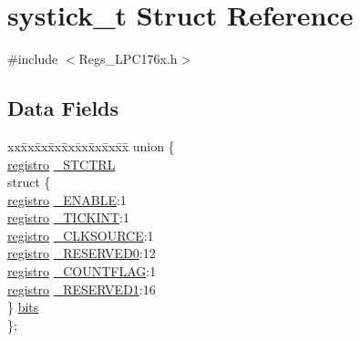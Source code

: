 \hypertarget{structsystick__t}{}\section{systick\+\_\+t Struct Reference}
\label{structsystick__t}


{\ttfamily \#include $<$Regs\+\_\+\+L\+P\+C176x.\+h$>$}

\subsection*{Data Fields}
\begin{DoxyCompactItemize}
\item 
\begin{tabbing}
xx\=xx\=xx\=xx\=xx\=xx\=xx\=xx\=xx\=\kill
union \{\\
\>\mbox{\hyperlink{_regs___l_p_c176x_8h_a7834e059ad90540ce735ec41183ff05a}{registro}} \mbox{\hyperlink{structsystick__t_acdd477331bfd988d70f5d25006e76bb1}{\_STCTRL}}\\
\>struct \{\\
\>\>\mbox{\hyperlink{_regs___l_p_c176x_8h_a7834e059ad90540ce735ec41183ff05a}{registro}} \mbox{\hyperlink{structsystick__t_a34579b54e26cee27fc08410abc1b2455}{\_ENABLE}}:1\\
\>\>\mbox{\hyperlink{_regs___l_p_c176x_8h_a7834e059ad90540ce735ec41183ff05a}{registro}} \mbox{\hyperlink{structsystick__t_af95dd18e82eea4994a1fcdfbed315e97}{\_TICKINT}}:1\\
\>\>\mbox{\hyperlink{_regs___l_p_c176x_8h_a7834e059ad90540ce735ec41183ff05a}{registro}} \mbox{\hyperlink{structsystick__t_a88332e1fbc3462fcc10913ee99f128b9}{\_CLKSOURCE}}:1\\
\>\>\mbox{\hyperlink{_regs___l_p_c176x_8h_a7834e059ad90540ce735ec41183ff05a}{registro}} \mbox{\hyperlink{structsystick__t_a6f1ac6dd76a3ef6139b75fc349ad786c}{\_RESERVED0}}:12\\
\>\>\mbox{\hyperlink{_regs___l_p_c176x_8h_a7834e059ad90540ce735ec41183ff05a}{registro}} \mbox{\hyperlink{structsystick__t_a64f7505b22e668887fff49359f76721f}{\_COUNTFLAG}}:1\\
\>\>\mbox{\hyperlink{_regs___l_p_c176x_8h_a7834e059ad90540ce735ec41183ff05a}{registro}} \mbox{\hyperlink{structsystick__t_a88bc97ea4e980ba2f30908023e5be4ff}{\_RESERVED1}}:16\\
\>\} \mbox{\hyperlink{structsystick__t_af89b228cefdf85bf13b72f7c975da4d1}{bits}}\\
\}; \\


\end{tabbing}
\end{DoxyCompactItemize}
